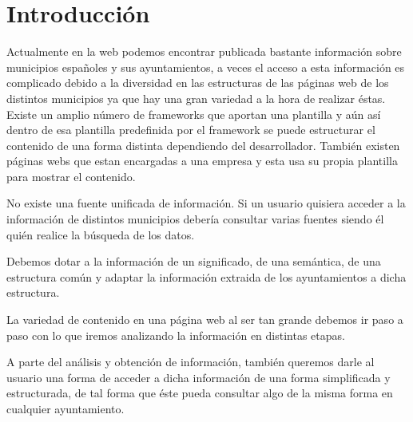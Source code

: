 %
%
%
%
%
%
%

\chapter*{Introducción}

	Actualmente en la web podemos encontrar publicada bastante información sobre municipios españoles y sus ayuntamientos, a veces el acceso a esta información es complicado debido a la diversidad en las estructuras de las páginas web de los distintos municipios ya que hay una gran variedad a la hora de realizar éstas. Existe un amplio número de frameworks que aportan una plantilla y aún así dentro de esa plantilla predefinida por el framework se puede estructurar el contenido de una forma distinta dependiendo del desarrollador. También existen páginas webs que estan encargadas a una empresa y esta usa su propia plantilla para mostrar el contenido.
	
No existe una fuente unificada de información. Si un usuario quisiera acceder a la información de distintos municipios debería consultar varias fuentes siendo él quién realice la búsqueda de los datos.
 
	Debemos dotar a la información de un significado, de una semántica, de una estructura común y adaptar la información extraida de los ayuntamientos a dicha estructura.

	La variedad de contenido en una página web al ser tan grande debemos ir paso a paso con lo que iremos analizando la información en distintas etapas.

	A parte del análisis y obtención de información, también queremos darle al usuario una forma de acceder a dicha información de una forma simplificada y estructurada, de tal forma que éste pueda consultar algo de la misma forma en cualquier ayuntamiento.


